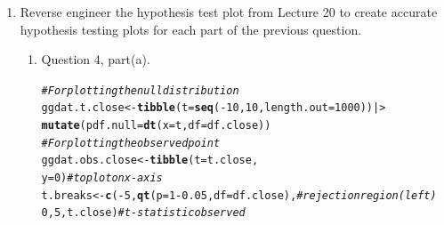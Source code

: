 \documentclass{article}\usepackage[]{graphicx}\usepackage[]{xcolor}
\makeatletter
\newcommand{\hlnum}[1]{\textcolor[rgb]{0.686,0.059,0.569}{#1}}%
\newcommand{\hlsng}[1]{\textcolor[rgb]{0.192,0.494,0.8}{#1}}%
\newcommand{\hlcom}[1]{\textcolor[rgb]{0.678,0.584,0.686}{\textit{#1}}}%
\newcommand{\hlopt}[1]{\textcolor[rgb]{0,0,0}{#1}}%
\newcommand{\hldef}[1]{\textcolor[rgb]{0.345,0.345,0.345}{#1}}%
\newcommand{\hlkwb}[1]{\textcolor[rgb]{0.69,0.353,0.396}{#1}}%
\newcommand{\hlkwc}[1]{\textcolor[rgb]{0.333,0.667,0.333}{#1}}%
\newcommand{\hlkwd}[1]{\textcolor[rgb]{0.737,0.353,0.396}{\textbf{#1}}}%
\newenvironment{kframe}{%
 \def\at@end@of@kframe{}%
 \ifinner\ifhmode%
  \def\at@end@of@kframe{\end{minipage}}%
  \begin{minipage}{\columnwidth}%
 \fi\fi%
 \def\FrameCommand##1{\hskip\@totalleftmargin \hskip-\fboxsep
 \colorbox{shadecolor}{##1}\hskip-\fboxsep
     \hskip-\linewidth \hskip-\@totalleftmargin \hskip\columnwidth}%
 \MakeFramed {\advance\hsize-\width
   \@totalleftmargin\z@ \linewidth\hsize
   \@setminipage}}%
 {\par\unskip\endMakeFramed%
 \at@end@of@kframe}
\newenvironment{knitrout}{}{} %
\makeatother
\begin{document}
\begin{enumerate}
\item Reverse engineer the hypothesis test plot from Lecture 20 to create accurate
hypothesis testing plots for each part of the previous question.
\begin{enumerate}
  \item Question 4, part(a).
\begin{knitrout}\scriptsize
{}\color{fgcolor}\begin{kframe}
\begin{alltt}
\hlcom{# For plotting the null distribution}
\hldef{ggdat.t.close} \hlkwb{<-} \hlkwd{tibble}\hldef{(}\hlkwc{t}\hldef{=}\hlkwd{seq}\hldef{(}\hlopt{-}\hlnum{10}\hldef{,}\hlnum{10}\hldef{,}\hlkwc{length.out}\hldef{=}\hlnum{1000}\hldef{))|>}
\hlkwd{mutate}\hldef{(}\hlkwc{pdf.null} \hldef{=} \hlkwd{dt}\hldef{(}\hlkwc{x}\hldef{=t,} \hlkwc{df}\hldef{=df.close))}
\hlcom{# For plotting the observed point}
\hldef{ggdat.obs.close} \hlkwb{<-} \hlkwd{tibble}\hldef{(}\hlkwc{t} \hldef{= t.close,}
                        \hlkwc{y} \hldef{=} \hlnum{0}\hldef{)} \hlcom{# to plot on x-axis}
\hldef{t.breaks} \hlkwb{<-} \hlkwd{c}\hldef{(}\hlopt{-}\hlnum{5}\hldef{,} \hlkwd{qt}\hldef{(}\hlkwc{p} \hldef{=} \hlnum{1}\hlopt{-}\hlnum{0.05}\hldef{,} \hlkwc{df} \hldef{= df.close),} \hlcom{# rejection region (left)}
            \hlnum{0}\hldef{,} \hlnum{5}\hldef{, t.close)}                  \hlcom{# t-statistic observed}

\end{alltt}
\end{kframe}
\end{knitrout}
\end{enumerate}
\end{enumerate}
\end{document}
